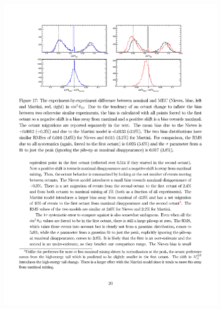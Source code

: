 \begin{figure}[htpb]
\begin{center}
  \begin{minipage}[t]{.45\textwidth}
    \begin{center}
      \includegraphics[width=\textwidth] {figures/nieves_theta23.pdf}
    \end{center}
  \end{minipage}
  \begin{minipage}[t]{.45\textwidth}
    \begin{center}

\end{center}
\end{minipage}
\end{center}
\end{figure}
